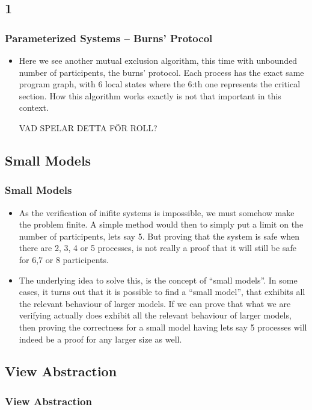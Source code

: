 \documentclass[handout]{beamer}
\begin{document}
\begin{footnotesize}
\begin{frame}
\begin{itemize}
  \end{itemize}
\end{frame}

\subsection*{1}
\begin{frame}
  \frametitle{Parameterized Systems -- Burns' Protocol}
\begin{itemize}
\item
Here we see another mutual exclusion algorithm, this time with unbounded number of participents, the burns' protocol. Each process has the exact same program graph, with 6 local states where the 6:th one represents the critical section. How this algorithm works exactly is not that important in this context.

VAD SPELAR DETTA FÖR ROLL?

\end{itemize}
\end{frame}


\subsection{Small Models}
\begin{frame}
  \frametitle{Small Models}
  \begin{itemize}
  \item
As the verification of inifite systems is impossible, we must somehow make the problem finite. A simple method would then to simply put a limit on the number of participents, lets say 5. But proving that the system is safe when there are 2, 3, 4 or 5 processes, is not really a proof that it will still be safe for 6,7 or 8 participents.

\item
    The underlying idea to solve this, is the concept of ``small models''. In some cases, it turns out that it is possible to find a ``small model'', that exhibits all the relevant behaviour of larger models. If we can prove that what we are verifying actually does exhibit all the relevant behaviour of larger models, then proving the correctness for a small model having lets say 5 processes will indeed be a proof for any larger size as well.

  \end{itemize}
\end{frame}

\subsection{View Abstraction}
\begin{frame}
\frametitle{View Abstraction} %


\end{frame}
\end{footnotesize}
\end{document}
